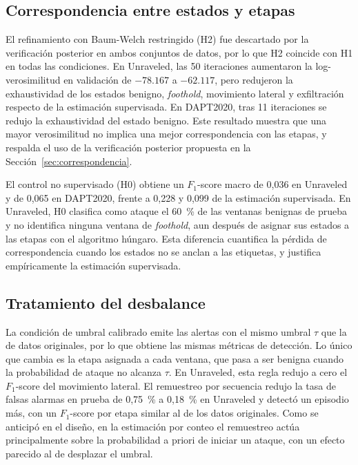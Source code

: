 \subsection{Correspondencia entre estados y etapas}
\label{sec:res_correspondencia}
El refinamiento con Baum-Welch restringido (H2) fue descartado por la verificación posterior en ambos conjuntos de datos, por lo que H2 coincide con H1 en todas las condiciones. En Unraveled, las 50 iteraciones aumentaron la log-verosimilitud en validación de $-78.167$ a $-62.117$, pero redujeron la exhaustividad de los estados benigno, \textit{foothold}, movimiento lateral y exfiltración respecto de la estimación supervisada. En DAPT2020, tras 11 iteraciones se redujo la exhaustividad del estado benigno. Este resultado muestra que una mayor verosimilitud no implica una mejor correspondencia con las etapas, y respalda el uso de la verificación posterior propuesta en la Sección~\ref{sec:correspondencia}.

El control no supervisado (H0) obtiene un $F_1$-score macro de 0,036 en Unraveled y de 0,065 en DAPT2020, frente a 0,228 y 0,099 de la estimación supervisada. En Unraveled, H0 clasifica como ataque el 60~\% de las ventanas benignas de prueba y no identifica ninguna ventana de \textit{foothold}, aun después de asignar sus estados a las etapas con el algoritmo húngaro. Esta diferencia cuantifica la pérdida de correspondencia cuando los estados no se anclan a las etiquetas, y justifica empíricamente la estimación supervisada.

\subsection{Tratamiento del desbalance}
La condición de umbral calibrado emite las alertas con el mismo umbral $\tau$ que la de datos originales, por lo que obtiene las mismas métricas de detección. Lo único que cambia es la etapa asignada a cada ventana, que pasa a ser benigna cuando la probabilidad de ataque no alcanza $\tau$. En Unraveled, esta regla redujo a cero el $F_1$-score del movimiento lateral. El remuestreo por secuencia redujo la tasa de falsas alarmas en prueba de 0,75~\% a 0,18~\% en Unraveled y detectó un episodio más, con un $F_1$-score por etapa similar al de los datos originales. Como se anticipó en el diseño, en la estimación por conteo el remuestreo actúa principalmente sobre la probabilidad a priori de iniciar un ataque, con un efecto parecido al de desplazar el umbral.


